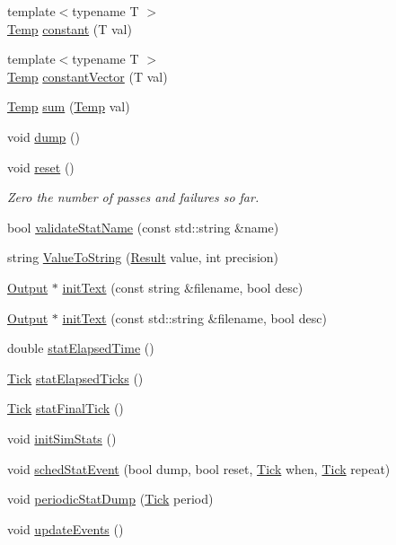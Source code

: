 \begin{DoxyCompactItemize}
{\footnotesize template$<$typename T $>$ }\\\hyperlink{classStats_1_1Temp}{Temp} \hyperlink{namespaceStats_aee7bc2d5f58c9e1c5d24007800542032}{constant} (T val)
\item 
{\footnotesize template$<$typename T $>$ }\\\hyperlink{classStats_1_1Temp}{Temp} \hyperlink{namespaceStats_a60d2ae8cfe1fa437cac8afbeab4999da}{constantVector} (T val)
\item 
\hyperlink{classStats_1_1Temp}{Temp} \hyperlink{namespaceStats_adb8b0b9d553e52514e3db14f6bf7c449}{sum} (\hyperlink{classStats_1_1Temp}{Temp} val)
\item 
void \hyperlink{namespaceStats_a0f20c2022d6828b0b8f40e78824bc4a3}{dump} ()
\item 
void \hyperlink{namespaceStats_ab9cd159e7f4ac914ca3db1a14ff1d8a8}{reset} ()
\begin{DoxyCompactList}\small\item\em Zero the number of passes and failures so far. \item\end{DoxyCompactList}\item 
bool \hyperlink{namespaceStats_a62d3f8e1a5873346c840f87a24e8b2ee}{validateStatName} (const std::string \&name)
\item 
string \hyperlink{namespaceStats_a82baf1560e7ae742b09dae28c115726d}{ValueToString} (\hyperlink{namespaceStats_ad874d2cfd4b4a29ebd480bb2e67f20ae}{Result} value, int precision)
\item 
\hyperlink{structStats_1_1Output}{Output} $\ast$ \hyperlink{namespaceStats_aff4528f6c0e99aac2ae6bfbba25349aa}{initText} (const string \&filename, bool desc)
\item 
\hyperlink{structStats_1_1Output}{Output} $\ast$ \hyperlink{namespaceStats_af375d792139b2c79388c158909cfd684}{initText} (const std::string \&filename, bool desc)
\item 
double \hyperlink{namespaceStats_a7c6e317fe9c5940f569f4cfcc2dfc4f0}{statElapsedTime} ()
\item 
\hyperlink{base_2types_8hh_a5c8ed81b7d238c9083e1037ba6d61643}{Tick} \hyperlink{namespaceStats_af28ec9ce3803a1b3c1bed5ff00dcfc3d}{statElapsedTicks} ()
\item 
\hyperlink{base_2types_8hh_a5c8ed81b7d238c9083e1037ba6d61643}{Tick} \hyperlink{namespaceStats_a6c4d8a90f360411dd56c18419fd717e2}{statFinalTick} ()
\item 
void \hyperlink{namespaceStats_a41c3cca28455a2222dde08e12245c9bc}{initSimStats} ()
\item 
void \hyperlink{namespaceStats_a56048d09cf003ffc313141376a84e7ad}{schedStatEvent} (bool dump, bool reset, \hyperlink{base_2types_8hh_a5c8ed81b7d238c9083e1037ba6d61643}{Tick} when, \hyperlink{base_2types_8hh_a5c8ed81b7d238c9083e1037ba6d61643}{Tick} repeat)
\item 
void \hyperlink{namespaceStats_a177a9c0907d7af207ceba422e0429cec}{periodicStatDump} (\hyperlink{base_2types_8hh_a5c8ed81b7d238c9083e1037ba6d61643}{Tick} period)
\item 
void \hyperlink{namespaceStats_a1f815ddbb90ccb7fb9490080dcb6f3c5}{updateEvents} ()
\end{DoxyCompactItemize}
